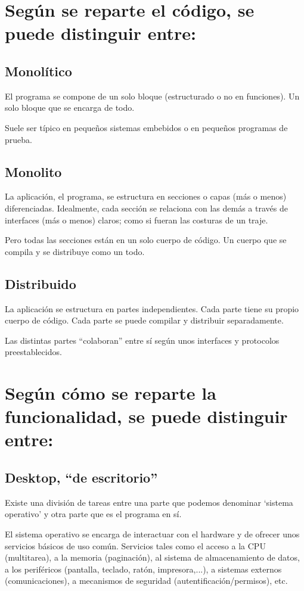 \documentclass[spanish,12pt,a4paper,final,oneside]{book}
\begin{document}
\section{Según se reparte el código, se puede distinguir entre:}


\subsection{Monolítico}
El programa se compone de un solo bloque (estructurado o no en funciones). Un solo bloque que se encarga de todo.

Suele ser típico en pequeños sistemas embebidos o en pequeños programas de prueba.

\subsection{Monolito}

La aplicación, el programa, se estructura en secciones o capas (más o menos) diferenciadas. Idealmente, cada sección se relaciona con las demás a través de interfaces (más o menos) claros; como si fueran las costuras de un traje.

Pero todas las secciones están en un solo cuerpo de código. Un cuerpo que se compila y se distribuye como un todo. 


\subsection{Distribuido}

La aplicación se estructura en partes independientes. Cada parte tiene su propio cuerpo de código. Cada parte se puede compilar y distribuir separadamente.

Las distintas partes ``colaboran'' entre sí según unos interfaces y protocolos preestablecidos.


\section{Según cómo se reparte la funcionalidad, se puede distinguir entre:}

\subsection{Desktop, ``de escritorio''}
Existe una división de tareas entre una parte que podemos denominar `sistema operativo' y otra parte que es el programa en sí.

El sistema operativo se encarga de interactuar con el hardware y de ofrecer unos servicios básicos de uso común. Servicios tales como el acceso a la CPU (multitarea), a la memoria (paginación), al sistema de almacenamiento de datos, a los periféricos (pantalla, teclado, ratón, impresora,...), a sistemas externos (comunicaciones), a mecanismos de seguridad (autentificación/permisos), etc.
\end{document}
